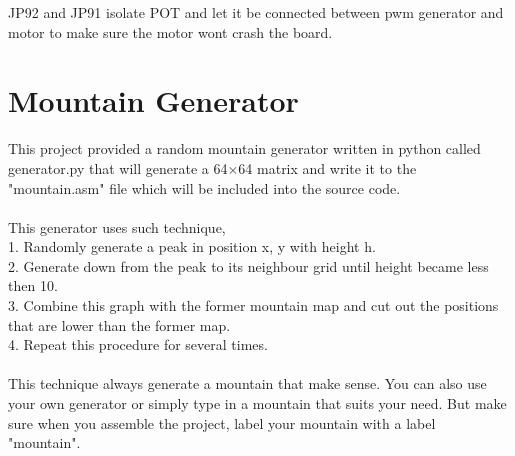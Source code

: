 \documentclass[a4paper, 12 pt]{report}
\begin{document}
JP92 and JP91 isolate POT and let it be connected between pwm generator and motor to make sure the motor wont crash the board. 
\newpage

\section{Mountain Generator}
This project provided a random mountain generator written in python called generator.py that will generate a 64$\times$64 matrix and write it to the "mountain.asm" file which will be included into the source code.\\\\
This generator uses such technique,\\
1. Randomly generate a peak in position x, y with height h.\\
2. Generate down from the peak to its neighbour grid until height became less then 10.\\
3. Combine this graph with the former mountain map and cut out the positions that are lower than the former map.\\
4. Repeat this procedure for several times.\\\\
This technique always generate a mountain that make sense. You can also use your own generator or simply type in a mountain that suits your need. But make sure when you assemble the project, label your mountain with a label "mountain".
\newpage
\end{document}
